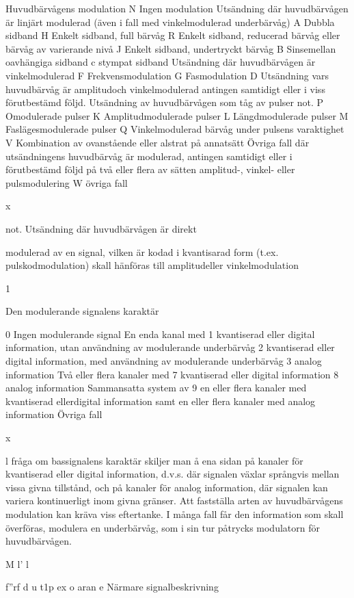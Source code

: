 Huvudbärvågens modulation
N Ingen modulation
Utsändning där huvudbärvågen är linjärt modulerad
(även i fall med vinkelmodulerad underbärvåg)
A Dubbla sidband
H Enkelt sidband, full bärvåg
R Enkelt sidband, reducerad bärvåg eller bärvåg av varierande nivå
J Enkelt sidband, undertryckt bärvåg
B Sinsemellan oavhängiga sidband
c stympat sidband
Utsändning där huvudbärvågen är vinkelmodulerad
F Frekvensmodulation
G Fasmodulation
D Utsändning vars huvudbärvåg är amplitudoch vinkelmodulerad antingen samtidigt eller
i viss förutbestämd följd.
Utsändning av huvudbärvågen som tåg av pulser not.
P Omodulerade pulser
K Amplitudmodulerade pulser
L Längdmodulerade pulser
M Faslägesmodulerade pulser
Q Vinkelmodulerad bärvåg under pulsens varaktighet
V Kombination av ovanstående eller alstrat på
annatsätt
Övriga fall där utsändningens huvudbärvåg är modulerad, antingen samtidigt eller i förutbestämd följd på
två eller flera av sätten amplitud-, vinkel- eller pulsmodulering
W
övriga fall

x

not. Utsändning där huvudbärvågen är direkt

modulerad av en signal, vilken är kodad
i kvantisarad form (t.ex. pulskodmodulation) skall hänföras till amplitudeller vinkelmodulation

1

Den modulerande signalens karaktär

0 Ingen modulerande signal
En enda kanal med
1 kvantiserad eller digital information, utan användning av modulerande underbärvåg
2 kvantiserad eller digital information, med användning av modulerande underbärvåg
3 analog information
Två eller flera kanaler med
7 kvantiserad eller digital information
8 analog information
Sammansatta system av
9 en eller flera kanaler med kvantiserad ellerdigital information samt
en eller flera kanaler med analog
information
Övriga fall

x

l fråga om bassignalens karaktär skiljer
man å ena sidan på kanaler för kvantiserad eller digital information, d.v.s. där signalen växlar språngvis mellan vissa givna tillstånd, och på kanaler för analog information, där signalen kan variera kontinuerligt inom givna gränser.
Att fastställa arten av huvudbärvågens modulation kan kräva viss eftertanke. I många fall
får den information som skall överföras, modulera en underbärvåg, som i sin tur påtrycks
modulatorn för huvudbärvågen.

M l' l

f''rf
d
u t1p ex o aran e
Närmare signalbeskrivning

